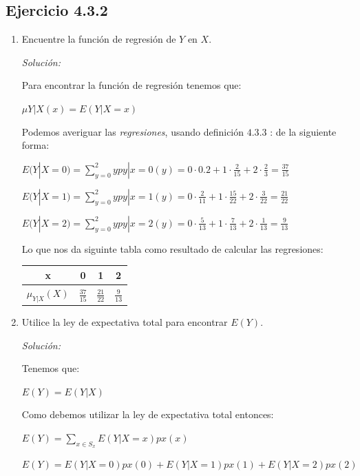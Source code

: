 \documentclass{article}\usepackage[]{graphicx}\usepackage[]{color}
\begin{document}
\subsection{Ejercicio 4.3.2}
\begin{enumerate}
    \item Encuentre la función de regresión de $Y$ en $X$.

 \textit{Solución:}
 
Para encontrar la función de regresión tenemos que:

$\mu Y|X(x) = E(Y|X = x)$

Podemos averiguar las \textit{regresiones}, usando definici\'on $4.3.3$ \cite[~p\'ag. 171]{Akr16}: de la siguiente forma:

\begin{center}
$E(Y|X = 0)= \sum_{y=0}^{2}ypy|x= 0(y)= 0 \cdot 0.2 + 1 \cdot \frac{2}{15} + 2 \cdot \frac{2}{3} = \frac{ 37}{15}$

$E(Y|X = 1)= \sum_{y=0}^{2}ypy|x= 1(y)= 0 \cdot \frac{2}{11} + 1 \cdot \frac{15}{22} + 2 \cdot \frac{3}{22} = \frac{21}{22}$

$E(Y|X = 2)= \sum_{y=0}^{2}ypy|x= 2(y)= 0 \cdot  \frac{5}{13} + 1 \cdot \frac{7}{13} + 2 \cdot \frac{1}{13} = \frac{9}{13}$
\end{center}

Lo que nos da siguinte tabla como resultado de calcular las regresiones:
\begin{table}[H]
\centering
\def\arraystretch{1.5}
\begin{tabular}{c|c c c }
x    & 0     & 1   & 2   \\ \hline
$\mu_{Y|X}(X)$ & $\frac{37}{15}$ & $\frac{21}{22}$ & $\frac{9}{13}$ 
\end{tabular}
\end{table}

\item Utilice la ley de expectativa total para encontrar $E(Y)$.

\textit{Solución:}

Tenemos que:


\begin{center}
$E(Y) = E(Y|X)$
\end{center}


Como debemos utilizar la ley de expectativa total entonces:
\begin{center}
$E(Y)= \sum_{x \in S_{x}} E(Y|X=x)px(x)$

$E(Y)= E(Y|X = 0)px(0)+ E(Y|X = 1)px(1)+ E(Y|X=2)px(2)$
\end{center}


\end{enumerate}
\end{document}
